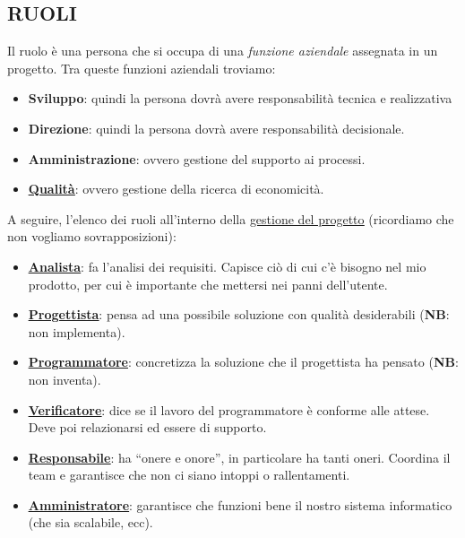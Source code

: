 		\subsection{RUOLI}  \label{ruoli}
		Il ruolo è una persona che si occupa di una \textit{funzione aziendale} assegnata in un progetto. Tra queste funzioni aziendali troviamo:
		\begin{itemize}
			\item \textbf{Sviluppo}: quindi la persona dovrà avere responsabilità tecnica e realizzativa
			\item \textbf{Direzione}: quindi la persona dovrà avere responsabilità decisionale.
			\item \textbf{Amministrazione}: ovvero gestione del supporto ai processi.
			\item \textbf{\underline{\hyperref[qualita]{Qualità}}}: ovvero gestione della ricerca di economicità.
		\end{itemize}
		A seguire, l'elenco dei ruoli all'interno della \underline{\hyperref[gestioneprogetto]{gestione del progetto}} (ricordiamo che non vogliamo sovrapposizioni):
		\begin{itemize}
		\item \textbf{\underline{\hyperref[analista]{Analista}}}: fa l'analisi dei requisiti. Capisce ciò di cui c'è bisogno nel mio prodotto, per cui è importante che mettersi nei panni dell'utente.
		\item \textbf{\underline{\hyperref[progettista]{Progettista}}}: pensa ad una possibile soluzione con qualità desiderabili (\textbf{NB}: non implementa).
		\item \textbf{\underline{\hyperref[programmatore]{Programmatore}}}: concretizza la soluzione che il progettista ha pensato (\textbf{NB}: non inventa).
		\item \textbf{\underline{\hyperref[verificatore]{Verificatore}}}: dice se il lavoro del programmatore è conforme alle attese. Deve poi relazionarsi ed essere di supporto.
		\item \textbf{\underline{\hyperref[responsabile]{Responsabile}}}: ha ``onere e onore'', in particolare ha tanti oneri. Coordina il team e garantisce che non ci siano intoppi o rallentamenti.
		\item \textbf{\underline{\hyperref[amministratore]{Amministratore}}}: garantisce che funzioni bene il nostro sistema informatico (che sia scalabile, ecc).
		\end{itemize}
